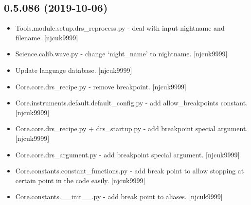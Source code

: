 \documentclass[a4paper,10pt,english]{report}
\begin{document}
\subsection{0.5.086 (2019-10-06)}
\label{\detokenize{misc/changelog:id55}}\begin{itemize}
\item {} 
Tools.module.setup.drs\_reprocess.py - deal with input nightname and
filename. {[}njcuk9999{]}

\item {} 
Science.calib.wave.py - change ‘night\_name’ to nightname. {[}njcuk9999{]}

\item {} 
Update language database. {[}njcuk9999{]}

\item {} 
Core.core.drs\_recipe.py - remove breakpoint. {[}njcuk9999{]}

\item {} 
Core.instruments.default.default\_config.py - add allow\_breakpoints
constant. {[}njcuk9999{]}

\item {} 
Core.core.drs\_recipe.py + drs\_startup.py - add breakpoint special
argument. {[}njcuk9999{]}

\item {} 
Core.core.drs\_argument.py - add breakpoint special argument.
{[}njcuk9999{]}

\item {} 
Core.constants.constant\_functions.py - add break point to allow
stopping at certain point in the code easily. {[}njcuk9999{]}

\item {} 
Core.constants.\_\_init\_\_.py - add break point to aliases. {[}njcuk9999{]}

\end{itemize}
\end{document}
